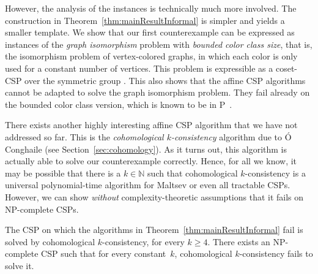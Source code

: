 \documentclass[a4paper,english, thm-restate]{lipics-v2021}
\newcommand{\bbN}{\mathbb{N}}
\begin{document}
	However, the analysis of the instances is technically much more involved.
	The construction in Theorem~\ref{thm:mainResultInformal} is simpler and yields a smaller template.
	We show that our first counterexample can be expressed as instances of the \emph{graph isomorphism} problem with \emph{bounded color class size},
	that is, the isomorphism problem of vertex-colored graphs, in which each color is only used for a constant number of vertices.
	This problem is expressible as a coset-CSP over the symmetric group \cite{BerkholzGrohe2017}.
	This also shows that the affine CSP algorithms cannot be adapted to solve the graph isomorphism problem. They fail already on the bounded color class version, which is known to be in P~\cite{FurstHopcroftLuks80}.


	
	
	
	
	There exists another highly interesting affine CSP algorithm that we have not addressed so far. This is the \emph{cohomological $k$\nobreakdash-consistency} algorithm due to Ó Conghaile \cite{OConghaile22} (see Section~\ref{sec:cohomology}). 
	As it turns out, this algorithm is actually able to solve our counterexample correctly.
	Hence, for all we know, it may be possible that there is a $k \in \bbN$ such that cohomological $k$-consistency is a universal polynomial-time algorithm for Maltsev or even all tractable CSPs. However, we can show \emph{without} complexity-theoretic assumptions that it fails on NP-complete CSPs.
	\begin{theorem} 
		\label{thm:mainPowerOfCohomology}
		The CSP on which the algorithms in Theorem~\ref{thm:mainResultInformal} fail is solved by cohomological $k$\nobreakdash-consistency, for every $k \geq 4$.  
		There exists an NP-complete CSP such that for every constant~$k$, cohomological $k$-consistency fails to solve it.
	\end{theorem}	
\end{document}
